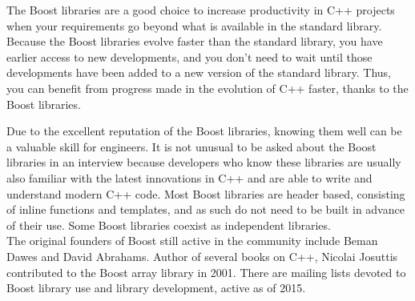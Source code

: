 The Boost libraries are a good choice to increase productivity in C++ projects when your requirements go beyond what is available in the standard library. Because the Boost libraries evolve faster than the standard library, you have earlier access to new developments, and you don’t need to wait until those developments have been added to a new version of the standard library. Thus, you can benefit from progress made in the evolution of C++ faster, thanks to the Boost libraries.

Due to the excellent reputation of the Boost libraries, knowing them well can be a valuable skill for engineers. It is not unusual to be asked about the Boost libraries in an interview because developers who know these libraries are usually also familiar with the latest innovations in C++ and are able to write and understand modern C++ code.
Most Boost libraries are header based, consisting of inline functions and templates, and as such do not need to be built in advance of their use. Some Boost libraries coexist as independent libraries.\\
The original founders of Boost still active in the community include Beman Dawes and David Abrahams. Author of several books on C++, Nicolai Josuttis contributed to the Boost array library in 2001. There are mailing lists devoted to Boost library use and library development, active as of 2015.
